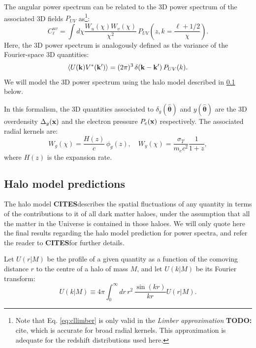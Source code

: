 \documentclass[useAMS,usenatbib]{mn2e}
\newcommand{\nv}{\hat{\boldsymbol{\theta}}}
\newcommand{\cites}{{\bf CITES}}
\newcommand{\todo}[1]{{\bf TODO:} #1}
\begin{document}
    The angular power spectrum can be related to the 3D power spectrum of the associated 3D fields $P_{UV}$ as\footnote{Note that Eq. \ref{eq:cllimber} is only valid in the {\sl Limber approximation} \todo{cite}, which is accurate for broad radial kernels. This approximation is adequate for the redshift distributions used here.}:
    \begin{equation}\label{eq:cllimber}
      C_\ell^{uv} = \int d\chi \frac{W_u(\chi)W_v(\chi)}{\chi^2}\,P_{UV}\left( z, k=\frac{\ell+1/2}{\chi} \right).
    \end{equation}
    Here, the 3D power spectrum is analogously defined as the variance of the Fourier-space 3D quantities:
    \begin{equation}
      \left\langle U({\bf k})V^*({\bf k}')\right\rangle = (2\pi)^3\,\delta({\bf k}-{\bf k}')\,P_{UV}(k).
    \end{equation}
    We will model the 3D power spectrum using the halo model described in \ref{ssec:theory.hm} below.

    In this formalism, the 3D quantities associated to $\delta_g(\nv)$ and $y(\nv)$ are the 3D overdensity $\Delta_g({\bf x})$ and the electron pressure $P_e({\bf x})$ respectively. The associated radial kernels are:
    \begin{equation}
      W_g(\chi)=\frac{H(z)}{c}\,\phi_g(z),\hspace{12pt}W_y(\chi)=\frac{\sigma_T}{m_ec^2}\frac{1}{1+z},
    \end{equation}
    where $H(z)$ is the expansion rate.

  \subsection{Halo model predictions}\label{ssec:theory.hm}
    The halo model \cites describes the spatial fluctuations of any quantity in terms of the contributions to it of all dark matter haloes, under the assumption that all the matter in the Universe is contained in those haloes. We will only quote here the final results regarding the halo model prediction for power spectra, and refer the reader to \cites for further details.
    
    Let $U(r|M)$ be the profile of a given quantity as a function of the comoving distance $r$ to the centre of a halo of mass $M$, and let $U(k|M)$ be its Fourier transform:
    \begin{equation}
      U(k|M)\equiv4\pi \int_0^\infty dr\,r^2\,\frac{\sin(kr)}{kr}U(r|M).
    \end{equation}
\end{document}
